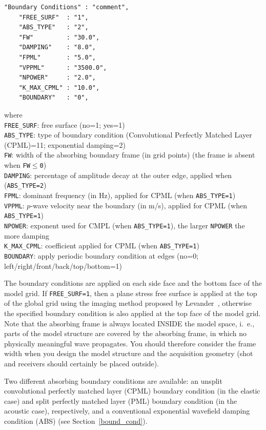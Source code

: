 \documentclass{hitec}
\newcommand{\option}[1]{\texttt{#1}}
\begin{document}
\begin{verbatim}
"Boundary Conditions" : "comment",
    "FREE_SURF"  : "1",
    "ABS_TYPE"   : "2",
    "FW"         : "30.0",
    "DAMPING"    : "8.0",
    "FPML"       : "5.0",
    "VPPML"      : "3500.0",
    "NPOWER"     : "2.0",
    "K_MAX_CPML" : "10.0",
    "BOUNDARY"   : "0",
\end{verbatim}
where\\
\option{FREE\_SURF}: free surface (no=1; yes=1)\\
\option{ABS\_TYPE}: type of boundary condition (Convolutional Perfectly Matched Layer (CPML)=11; exponential damping=2)\\
\option{FW}: width of the absorbing boundary frame (in grid points) (the frame is absent when \option{FW$\leq$0})\\
\option{DAMPING}: percentage of amplitude decay at the outer edge, applied when (\option{ABS\_TYPE=2})\\
\option{FPML}: dominant frequency (in Hz), applied for CPML (when \option{ABS\_TYPE=1})\\
\option{VPPML}: $p$-wave velocity near the boundary (in m/s), applied for CPML (when \option{ABS\_TYPE=1})\\
\option{NPOWER}:  exponent used for CMPL (when \option{ABS\_TYPE=1}), the larger \option{NPOWER} the more damping \\
\option{K\_MAX\_CPML}:  coefficient applied for CPML (when \option{ABS\_TYPE=1}) \\
\option{BOUNDARY}: apply periodic boundary condition at edges (no=0;
left/right/front/back/top/bottom=1)

The boundary conditions are applied on each side face and the bottom face of
the model grid. If \option{FREE\_SURF=1}, then a plane stress free surface is
applied at the top of the global grid  using the imaging method proposed by
Levander~\cite{levander:88}, otherwise the specified boundary condition is also
applied at the top face of the model grid. Note that the absorbing frame is
always located INSIDE the model space, i.\ e., parts of the model structure are
covered by the absorbing frame, in which no physically meaningful wave
propagates. You should therefore consider the frame width when you design the
model structure and the acquisition geometry (shot and receivers should
certainly be placed outside).

Two different absorbing boundary conditions are available: an unsplit
convolutional perfectly matched layer (CPML) boundary condition (in the elastic
case) and split perfectly matched layer (PML) boundary condition (in the
acoustic case), respectively, and a conventional exponential wavefield damping
condition (ABS) (see Section~\ref{bound_cond}).
\end{document}

